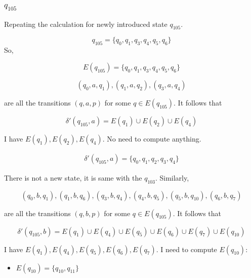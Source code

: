 \begin{center}
\subsubsection*{$q_{105}$}
\end{center}

Repeating the calculation for newly introduced state $q_{105}$.

\begin{equation*}
    q_{105} = \{ q_{0}, q_{1}, q_{3}, q_{4}, q_{5}, q_{6} \}
\end{equation*}
So,

\begin{equation*}
    E(q_{105}) = \{ q_{0}, q_{1}, q_{3}, q_{4}, q_{5}, q_{6} \}
\end{equation*}

\begin{equation*}
    (q_{0}, a, q_{1}), (q_{1}, a, q_{2}), (q_{3}, a, q_{4})
\end{equation*}

\noindent are all the transitions $(q, a, p)$ for some $q \in E(q_{105})$. It follows that

\begin{equation*}
    \delta'(q_{105}, a) = E(q_{1}) \cup E(q_{2}) \cup E(q_{4})
\end{equation*}

\noindent I have $E(q_{1}), E(q_{2}), E(q_{4})$. No need to compute anything.

\begin{align*}
    \delta'(q_{105}, a) = \{ q_{0}, q_{1}, q_{2}, q_{3}, q_{4} \}
\end{align*}

\noindent There is not a new state, it is same with the $q_{103}$. Similarly,

\begin{equation*}
    (q_{0}, b, q_{1}), (q_{1}, b, q_{6}), (q_{3}, b, q_{4}), (q_{4}, b, q_{5}), (q_{5}, b, q_{10}), (q_{6}, b, q_{7})
\end{equation*}

\noindent are all the transitions $(q, b, p)$ for some $q \in E(q_{105})$. It follows that

\begin{equation*}
    \delta'(q_{105}, b) = E(q_{1}) \cup E(q_{4}) \cup E(q_{5}) \cup E(q_{6}) \cup E(q_{7}) \cup E(q_{10})
\end{equation*}

\noindent I have $E(q_{1}), E(q_{4}), E(q_{5}), E(q_{6}), E(q_{7})$. I need to compute $E(q_{10})$:
\begin{itemize}
    \item $E(q_{10}) = \{ q_{10}, q_{11} \}$
\end{itemize}

